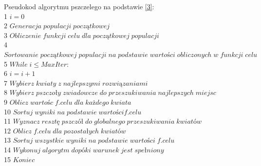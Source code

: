 \documentclass[a4paper, twoside, 12pt, justified]{article}
\begin{document}
	Pseudokod algorytmu pszczelego na podstawie \hyperlink{bees_code}{[3]}:\\
	1 \hspace{5mm} $i = 0$\\
	2 \hspace{5mm} $Generacja \; populacji \; pocz\text{ą}tkowej$\\
	3 \hspace{5mm} $Obliczenie \; funkcji \; celu \; dla \; pocz\text{ą}tkowej \; populacji$\\
	4 \hspace{5mm} $Sortowanie \; pocz\text{ą}tkowej \; populacji \; na \; podstawie \; warto\text{ś}ci \; obliczonych \; w \; funkcji \; celu$\\
	5 \hspace{5mm} $While \; i \leq MaxIter$:\\ 
	6 \hspace{20mm} $ i = i + 1$\\
	7 \hspace{20mm} $ Wybierz \; kwiaty \; z \; najlepszymi \; rozwi\text{ą}zaniami $\\
	8 \hspace{20mm} $ Wybierz \; pszczoły \; zwiadowcze \; do \; przeszukiwania \; najlepszych \; miejsc$\\
	9 \hspace{20mm} $ Oblicz \; warto\text{ś}c \; f. celu \; dla \; ka\text{ż}dego \; kwiata$\\
	10 \hspace{18mm} $ Sortuj \; wyniki \; na \; podstawie \; warto\text{ś}ci f. celu$\\
	11 \hspace{18mm} $ Wyznacz \; reszt\text{ę} \; pszcz\text{ół} \; do \; globalnego \; przeszukiwania \; kwiat\text{ó}w$\\
	12 \hspace{18mm} $ Oblicz \; f. celu \; dla \; pozosta\text{ł}ych \; kwiat\text{ó}w$\\
	13 \hspace{18mm} $ Sortuj \; wszystkie \; wyniki \; na \; podstawie \; warto\text{ś}ci \; f. celu$\\
	14 \hspace{18mm} $ Wykonuj \; algorytm \; dop\text{ó}ki \; warunek \; jest \; spe\text{ł}niony $\\
	15 \hspace{5mm} $Koniec$\\
	
	
	\newpage
	
\end{document}
